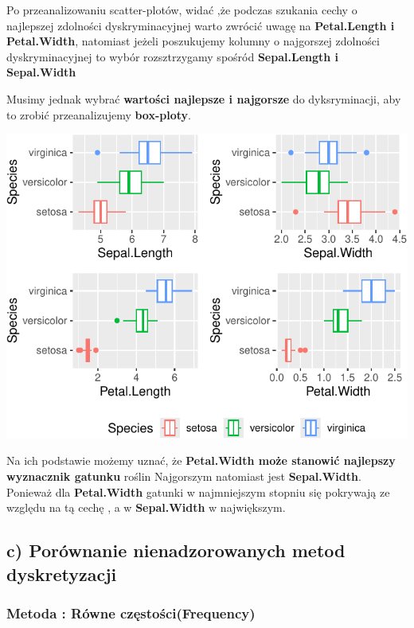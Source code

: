 \documentclass[
  12pt,
]{article}
\begin{document}
Po przeanalizowaniu scatter-plotów, widać ,że podczas szukania cechy o
najlepszej zdolności dyskryminacyjnej warto zwrócić uwagę na
\textbf{Petal.Length i Petal.Width}, natomiast jeżeli poszukujemy
kolumny o najgorszej zdolności dyskryminacyjnej to wybór rozsztrzygamy
spośród \textbf{Sepal.Length i Sepal.Width}

Musimy jednak wybrać \textbf{wartości najlepsze i najgorsze} do
dyksryminacji, aby to zrobić przeanalizujemy \textbf{box-ploty}.

\begin{center}\includegraphics{Sprawozdanie2_files/figure-latex/zad1b2-1} \end{center}

Na ich podstawie możemy uznać, że \textbf{Petal.Width może stanowić
najlepszy wyznacznik gatunku} roślin Najgorszym natomiast jest
\textbf{Sepal.Width}. Ponieważ dla \textbf{Petal.Width} gatunki w
najmniejszym stopniu się pokrywają ze względu na tą cechę , a w
\textbf{Sepal.Width} w największym.

\subsection{c) Porównanie nienadzorowanych metod
dyskretyzacji}\label{c-poruxf3wnanie-nienadzorowanych-metod-dyskretyzacji}

\subsubsection{Metoda : Równe
częstości(Frequency)}\label{metoda-ruxf3wne-czux119stoux15bcifrequency}
\end{document}
